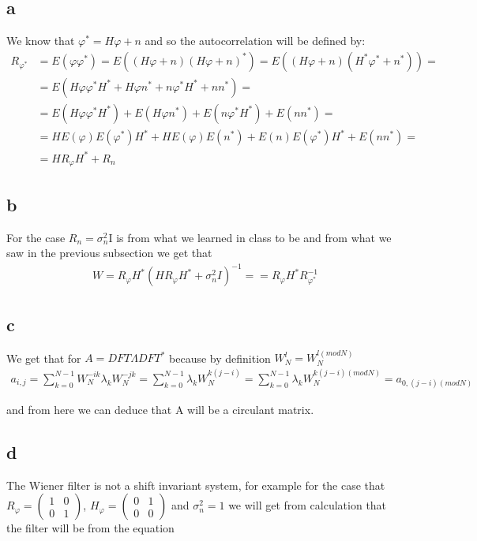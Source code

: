 \documentclass[a4paper]{article}
\begin{document}
\subsection*{a}
We know that $\varphi^{*} = H \varphi + n$ and so the autocorrelation will be defined by:
\begin{align}
    R_{\varphi^{*}} &= E(\varphi \varphi^{*}) = E(( H \varphi + n)( H \varphi + n)^*) = E(( H \varphi + n)( H^{*} \varphi^{*} + n^{*})) = \nonumber \\[2ex] 
    &= E(H\varphi\varphi^{*}H^{*}+H\varphi n^{*} + n \varphi^{*}H^{*}+ nn^{*}) = \nonumber \\[2ex] 
    &= E(H\varphi\varphi^{*}H^{*})+E(H\varphi n^{*}) + E(n \varphi^{*}H^{*}) + E(nn^{*}) = \nonumber \\[2ex] 
    &= H E(\varphi)E(\varphi^{*})H^{*}+H E(\varphi)E( n^{*}) + E(n) E(\varphi^{*})H^{*} + E(nn^{*})  = \nonumber \\[2ex] 
    &= H R_{\varphi} H^{*} + R_{n}
\end{align}
\subsection*{b}
For the case $R_{n} = \sigma_{n}^{2}$I is from what we learned in class to be and from  what we saw in the previous subsection we get that
\begin{align}
    W = R_{\varphi}H^{*}(HR_{\varphi}H^{*}+\sigma^{2}_{n}I)^{-1} =  = R_{\varphi} H^{*} R^{-1}_{\varphi^{*}}
\end{align}
\subsection*{c}
We get that for $A = DFT \Lambda DFT^{*}$ because by definition $W^{l}_{N}=W^{l (mod N)}_{N}$
\begin{align}
    a_{i,j} = \sum_{k=0}^{N-1}W_{N}^{-ik}\lambda_{k}W_{N}^{-jk} = \sum_{k=0}^{N-1}\lambda_{k}W_{N}^{k(j-i)} =  \sum_{k=0}^{N-1}\lambda_{k}W_{N}^{k(j-i)(mod N)} = a_{0,(j-i)(mod N)}
\end{align}

and from here we can deduce that A will be a circulant matrix.
\subsection*{d}
The Wiener  filter is not a shift invariant system, for example for the case that
$R_{\varphi} = \begin{pmatrix}
        1 & 0 \\ 
        0 & 1
    \end{pmatrix}$, $H_{\varphi} = \begin{pmatrix}
        0 & 1 \\ 
        0 & 0
    \end{pmatrix}$ and $\sigma^2_n = 1$ we will get from calculation that the filter will be from the equation
\end{document}
